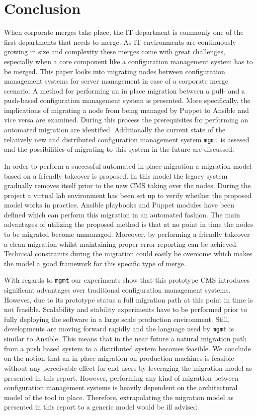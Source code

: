 \section{Conclusion}\label{sec:conclusion}
When corporate merges take place, the IT department is commonly one of the first departments that needs to merge. As IT environments are continuously growing in size and complexity these merges come with great challenges, especially when a core component like a configuration management system has to be merged. This paper looks into migrating nodes between configuration management systems for server management in case of a corporate merge scenario. A method for performing an in place migration between a pull- and a push-based configuration management system is presented. More specifically, the implications of migrating a node from being managed by Puppet to Ansible and vice versa are examined. During this process the prerequisites for performing an automated migration are identified. Additionally the current state of the relatively new and distributed configuration management system \texttt{mgmt} is assesed and the possibilities of migrating to this system in the future are discussed.

In order to perform a successful automated in-place migration  a migration model based on a friendly takeover is proposed. In this model the legacy system gradually removes itself prior to the new CMS taking over the nodes. During the project a virtual lab environment has been set up to verify whether the proposed model works in practice. Ansible playbooks and Puppet modules have been defined which can perform this migration in an automated fashion. The main advantages of utilizing the proposed method is that at no point in time the nodes to be migrated become unmanaged. Moreover, by performing a friendly takeover a clean migration whilst maintaining proper error reporting can be achieved. Technical constraints during the migration could easily be overcome which makes the model a good framework for this specific type of merge. 

With regards to \texttt{mgmt} our experiments show that this prototype CMS introduces significant advantages over traditional configuration management systems. However, due to its prototype status a full migration path at this point in time is not feasible. Scalability and stability experiments have to be performed prior to fully deploying the software in a large scale production environment. Still, developments are moving forward rapidly and the language used by \texttt{mgmt} is similar to Ansible. This means that in the near future a natural migration path from a push based system to a distributed system becomes feasible. We conclude on the notion that an in place migration on production machines is feasible without any perceivable effect for end users by leveraging the migration model as presented in this report. However, performing any kind of migration between configuration management systems is heavily dependent on the architectural model of the tool in place. Therefore, extrapolating the migration model as presented in this report to a generic model would be ill advised. 


